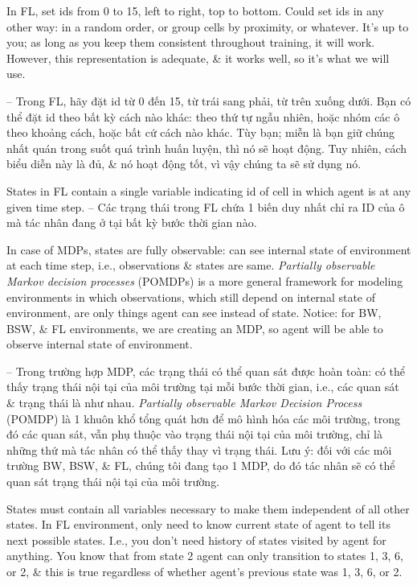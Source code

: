 \documentclass{article}
\begin{document}
\begin{itemize}
\begin{itemize}
        In FL, set ids from 0 to 15, left to right, top to bottom. Could set ids in any other way: in a random order, or group cells by proximity, or whatever. It's up to you; as long as you keep them consistent throughout training, it will work. However, this representation is adequate, \& it works well, so it's what we will use.

        -- Trong FL, hãy đặt id từ 0 đến 15, từ trái sang phải, từ trên xuống dưới. Bạn có thể đặt id theo bất kỳ cách nào khác: theo thứ tự ngẫu nhiên, hoặc nhóm các ô theo khoảng cách, hoặc bất cứ cách nào khác. Tùy bạn; miễn là bạn giữ chúng nhất quán trong suốt quá trình huấn luyện, thì nó sẽ hoạt động. Tuy nhiên, cách biểu diễn này là đủ, \& nó hoạt động tốt, vì vậy chúng ta sẽ sử dụng nó.

        {\sf States in FL contain a single variable indicating id of cell in which agent is at any given time step.} -- Các trạng thái trong FL chứa 1 biến duy nhất chỉ ra ID của ô mà tác nhân đang ở tại bất kỳ bước thời gian nào.

        In case of MDPs, states are fully observable: can see internal state of environment at each time step, i.e., observations \& states are same. {\it Partially observable Markov decision processes} (POMDPs) is a more general framework for modeling environments in which observations, which still depend on internal state of environment, are only things agent can see instead of state. Notice: for BW, BSW, \& FL environments, we are creating an MDP, so agent will be able to observe internal state of environment.

        -- Trong trường hợp MDP, các trạng thái có thể quan sát được hoàn toàn: có thể thấy trạng thái nội tại của môi trường tại mỗi bước thời gian, i.e., các quan sát \& trạng thái là như nhau. {\it Partially observable Markov Decision Process} (POMDP) là 1 khuôn khổ tổng quát hơn để mô hình hóa các môi trường, trong đó các quan sát, vẫn phụ thuộc vào trạng thái nội tại của môi trường, chỉ là những thứ mà tác nhân có thể thấy thay vì trạng thái. Lưu ý: đối với các môi trường BW, BSW, \& FL, chúng tôi đang tạo 1 MDP, do đó tác nhân sẽ có thể quan sát trạng thái nội tại của môi trường.

        States must contain all variables necessary to make them independent of all other states. In FL environment, only need to know current state of agent to tell its next possible states. I.e., you don't need history of states visited by agent for anything. You know that from state 2 agent can only transition to states 1, 3, 6, or 2, \& this is true regardless of whether agent's previous state was 1, 3, 6, or 2.


\end{itemize}
\end{itemize}
\end{document}
